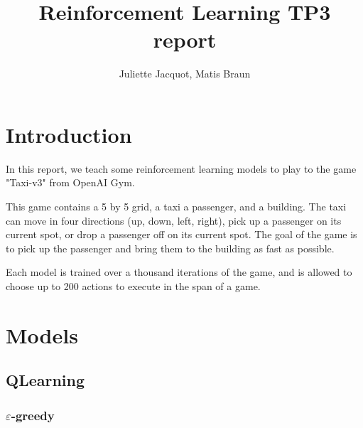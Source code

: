 \documentclass[11pt]{article}
\title{\vspace{-3cm}Reinforcement Learning TP3 report}
\author{Juliette Jacquot, Matis Braun}
\date{}
\begin{document}
\maketitle

\pagestyle{fancy}
\renewcommand\headrulewidth{1pt}
\renewcommand\footrulewidth{1pt}
\setlength{\headheight}{14pt}

\section*{Introduction}

In this report, we teach some reinforcement learning models to play to the game "Taxi-v3" from OpenAI Gym.

This game contains a 5 by 5 grid, a taxi a passenger, and a building.
The taxi can move in four directions (up, down, left, right), pick up a passenger on its current spot, or drop a passenger off on its current spot.
The goal of the game is to pick up the passenger and bring them to the building as fast as possible.

Each model is trained over a thousand iterations of the game, and is allowed to choose up to 200 actions to execute in the span of a game.

\section*{Models}

\subsection*{QLearning}


\subsubsection*{$\varepsilon$-greedy}

\end{document}
